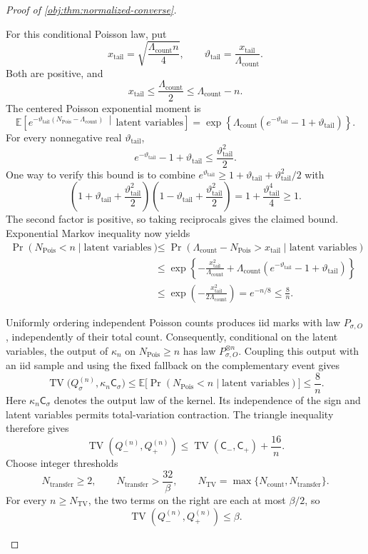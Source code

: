 \documentclass[11pt]{article}
\begin{document}
\begin{proof}[Proof of \cref{obj:thm:normalized-converse}]
\begin{enumerate}
For this conditional Poisson law, put
\[
x_{\mathrm{tail}}
=\sqrt{\frac{\Lambda_{\mathrm{count}}n}{4}},
\qquad
\vartheta_{\mathrm{tail}}
=\frac{x_{\mathrm{tail}}}{\Lambda_{\mathrm{count}}}.
\]
Both are positive, and
\[
x_{\mathrm{tail}}\le\frac{\Lambda_{\mathrm{count}}}{2}
\le\Lambda_{\mathrm{count}}-n.
\]
The centered Poisson exponential moment is
\[
\mathbb E\!\left[
e^{-\vartheta_{\mathrm{tail}}
(N_{\mathrm{Pois}}-\Lambda_{\mathrm{count}})}
\,\middle|\,\text{latent variables}\right]
=
\exp\!\left\{
\Lambda_{\mathrm{count}}
(e^{-\vartheta_{\mathrm{tail}}}-1+\vartheta_{\mathrm{tail}})
\right\}.
\]
For every nonnegative real \(\vartheta_{\mathrm{tail}}\),
\[
e^{-\vartheta_{\mathrm{tail}}}-1+\vartheta_{\mathrm{tail}}
\le\frac{\vartheta_{\mathrm{tail}}^2}{2}.
\]
One way to verify this bound is to combine
\(e^{\vartheta_{\mathrm{tail}}}\ge
1+\vartheta_{\mathrm{tail}}+\vartheta_{\mathrm{tail}}^2/2\)
with
\[
\left(1+\vartheta_{\mathrm{tail}}
+\frac{\vartheta_{\mathrm{tail}}^2}{2}\right)
\left(1-\vartheta_{\mathrm{tail}}
+\frac{\vartheta_{\mathrm{tail}}^2}{2}\right)
=1+\frac{\vartheta_{\mathrm{tail}}^4}{4}\ge1.
\]
The second factor is positive, so taking reciprocals gives the claimed bound. Exponential Markov inequality now yields
\[
\begin{aligned}
\Pr(N_{\mathrm{Pois}}<n\mid\text{latent variables})
&\le
\Pr(\Lambda_{\mathrm{count}}-N_{\mathrm{Pois}}>
x_{\mathrm{tail}}\mid\text{latent variables})\\
&\le
\exp\!\left\{
-\frac{x_{\mathrm{tail}}^2}{\Lambda_{\mathrm{count}}}
+\Lambda_{\mathrm{count}}
(e^{-\vartheta_{\mathrm{tail}}}-1+\vartheta_{\mathrm{tail}})
\right\}\\
&\le
\exp\!\left(-\frac{x_{\mathrm{tail}}^2}
                   {2\Lambda_{\mathrm{count}}}\right)
=e^{-n/8}
\le\frac8n.
\end{aligned}
\]

Uniformly ordering independent Poisson counts produces iid marks with law
\(P_{\sigma,O}\), independently of their total count. Consequently,
conditional on the latent variables, the output of
\(\kappa_n\) on \(N_{\mathrm{Pois}}\ge n\) has law
\(P_{\sigma,O}^{\otimes n}\). Coupling this output with an iid sample and using the fixed fallback on the complementary event gives
\[
\operatorname{TV}\bigl(Q_\sigma^{(n)},\kappa_n\mathsf C_\sigma\bigr)
\le
\mathbb E\bigl[
\Pr(N_{\mathrm{Pois}}<n\mid\text{latent variables})\bigr]
\le\frac8n.
\]
Here \(\kappa_n\mathsf C_\sigma\) denotes the output law of the kernel.
Its independence of the sign and latent variables permits total-variation contraction. The triangle inequality therefore gives
\[
\operatorname{TV}(Q_-^{(n)},Q_+^{(n)})
\le
\operatorname{TV}(\mathsf C_-,\mathsf C_+)+\frac{16}{n}.
\]
Choose integer thresholds
\[
N_{\mathrm{transfer}}\ge2,
\qquad
N_{\mathrm{transfer}}>\frac{32}{\beta},
\qquad
N_{\mathrm{TV}}
=\max\{N_{\mathrm{count}},N_{\mathrm{transfer}}\}.
\]
For every \(n\ge N_{\mathrm{TV}}\), the two terms on the right are each at most \(\beta/2\), so
\[
\operatorname{TV}(Q_-^{(n)},Q_+^{(n)})\le\beta.
\]


\end{enumerate}
\end{proof}
\end{document}
